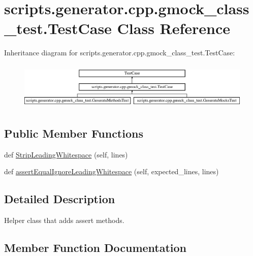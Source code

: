 \hypertarget{classscripts_1_1generator_1_1cpp_1_1gmock__class__test_1_1_test_case}{}\section{scripts.\+generator.\+cpp.\+gmock\+\_\+class\+\_\+test.\+Test\+Case Class Reference}
\label{classscripts_1_1generator_1_1cpp_1_1gmock__class__test_1_1_test_case}
Inheritance diagram for scripts.\+generator.\+cpp.\+gmock\+\_\+class\+\_\+test.\+Test\+Case\+:\begin{figure}[H]
\begin{center}
\leavevmode
\includegraphics[height=2.270270cm]{d4/da2/classscripts_1_1generator_1_1cpp_1_1gmock__class__test_1_1_test_case}
\end{center}
\end{figure}
\subsection*{Public Member Functions}
\begin{DoxyCompactItemize}
\item 
def \mbox{\hyperlink{classscripts_1_1generator_1_1cpp_1_1gmock__class__test_1_1_test_case_a057e0f4b46415792f532ff1644ad08dc}{Strip\+Leading\+Whitespace}} (self, lines)
\item 
def \mbox{\hyperlink{classscripts_1_1generator_1_1cpp_1_1gmock__class__test_1_1_test_case_adb85e60bac49d2732dc18e0e34ac3aa4}{assert\+Equal\+Ignore\+Leading\+Whitespace}} (self, expected\+\_\+lines, lines)
\end{DoxyCompactItemize}


\subsection{Detailed Description}
\begin{DoxyVerb}Helper class that adds assert methods.\end{DoxyVerb}
 

\subsection{Member Function Documentation}
\mbox{\label{classscripts_1_1generator_1_1cpp_1_1gmock__class__test_1_1_test_case_adb85e60bac49d2732dc18e0e34ac3aa4}} 
